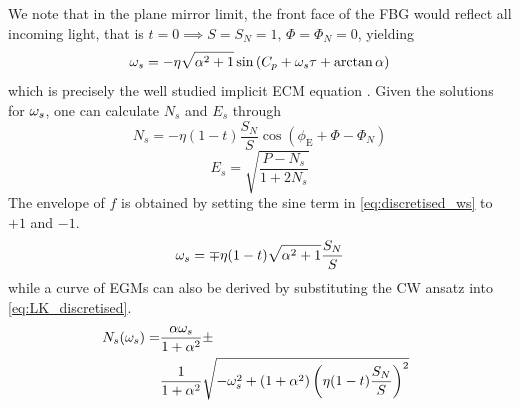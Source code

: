 %
We note that in the plane mirror limit, the front face of the FBG would reflect all incoming light, that is $ t = 0 \implies S = S_N = 1, \, \Phi = \Phi_N = 0$, yielding 
%
\begin{equation*}
    \omega_s = - \eta \sqrt{\alpha^2+1} \sin{(C_p + \omega_s \tau + \arctan\alpha})
\end{equation*}
%
which is precisely the well studied implicit ECM equation \cite{rottschafer2007ecm}. Given the solutions for $\omega_s$, one can calculate $N_s$ and $E_s$ through
%
\begin{equation}
    N_s = -\eta (1-t) \frac{S_N}{S} \cos{\left( \phi_\text{E} + \Phi - \Phi_N \right)}  
\end{equation}
%
\begin{equation}
    E_s = \sqrt{\frac{P - N_s}{1 + 2 N_s}}
\end{equation}
%
The envelope of $f$ is obtained by setting the sine term in \eqref{eq:discretised_ws} to $+1$ and $-1$.
%
\begin{equation}
    \label{eq:discretised_ws_envelope}
    \omega_s = \mp \eta (1-t) \sqrt{\alpha^2+1}\frac{S_N}{S}
\end{equation}
while a curve of EGMs can also be derived by substituting the CW ansatz into \eqref{eq:LK_discretised}.
%
\begin{gather}
    \label{eq:discretised_Ns_curve}
    \begin{aligned}
        \hspace{-0.5em}N_s(\omega_s) = &\frac{\alpha \omega_s}{1+\alpha^2} \pm \\
                    &\frac{1}{1+\alpha^2}\sqrt{-\omega_s^2 + (1+\alpha^2) \left(\eta (1-t) \frac{S_N}{S} \right)^2}        
    \end{aligned}
\end{gather}
%
    
    
    
